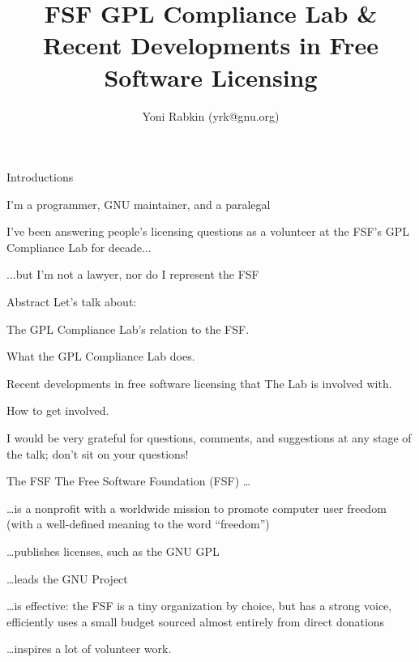 \documentclass[
  size=12pt,
  style=simple,
  paper=screen
]{powerdot}
\title{FSF GPL Compliance Lab \& Recent Developments in Free Software Licensing}
\author{Yoni Rabkin (yrk@gnu.org)}
\begin{document}
\maketitle

\begin{wideslide}{Introductions}
  \begin{itemize}
    \setlength{\itemsep}{1em}

    \nitem I'm a programmer, GNU maintainer, and a paralegal
    \pp

    \nitem I've been answering people's licensing questions as a
    volunteer at the FSF's GPL Compliance Lab for decade...
    \pp

    \nitem ...but I'm not a lawyer, nor do I represent the FSF
  \end{itemize}
\end{wideslide}

\begin{wideslide}{Abstract}
  Let's talk about:
  \begin{itemize}
    \setlength{\itemsep}{1em}

    \nitem The GPL Compliance Lab's relation to the FSF.

    \nitem What the GPL Compliance Lab does.

    \nitem Recent developments in free software licensing that The Lab
    is involved with.

    \nitem How to get involved.

  \end{itemize}
  \pp

  I would be very grateful for questions, comments, and suggestions at
  any stage of the talk; don't sit on your questions!
\end{wideslide}

\begin{wideslide}{The FSF}
  The Free Software Foundation (FSF) \ldots
  \begin{itemize}
    \setlength{\itemsep}{1em}

    \nitem \ldots is a nonprofit with a worldwide mission to promote
    computer user freedom\pp\\(with a well-defined meaning to the
    word ``freedom'')

    \pp

    \nitem \ldots publishes licenses, such as the GNU GPL

    \pp

    \nitem \ldots leads the GNU Project

    \pp

    \nitem \ldots is effective: the FSF is a tiny organization by choice,
    but has a strong voice, efficiently uses a small budget sourced
    almost entirely from direct donations

    \pp

    \nitem \ldots inspires a lot of volunteer work.
  \end{itemize}
\end{wideslide}
\end{document}
